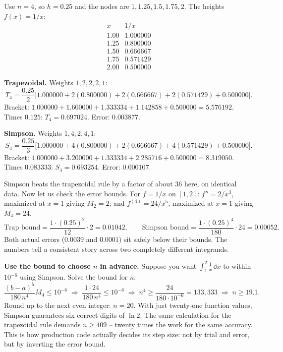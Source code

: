 Use $n = 4$, so $h = 0.25$ and the nodes are $1, 1.25, 1.5, 1.75, 2$. The heights $f(x) = 1/x$:
\[
\begin{array}{c|c}
x & 1/x\\\hline
1.00 & 1.000000\\
1.25 & 0.800000\\
1.50 & 0.666667\\
1.75 & 0.571429\\
2.00 & 0.500000
\end{array}
\]

\textbf{Trapezoidal.} Weights $1,2,2,2,1$:
\[
T_4 = \frac{0.25}{2}\big[1.000000 + 2(0.800000) + 2(0.666667) + 2(0.571429) + 0.500000\big].
\]
Bracket: $1.000000 + 1.600000 + 1.333334 + 1.142858 + 0.500000 = 5.576192$. Times $0.125$: $T_4 = 0.697024$. Error: $0.003877$.

\textbf{Simpson.} Weights $1,4,2,4,1$:
\[
S_4 = \frac{0.25}{3}\big[1.000000 + 4(0.800000) + 2(0.666667) + 4(0.571429) + 0.500000\big].
\]
Bracket: $1.000000 + 3.200000 + 1.333334 + 2.285716 + 0.500000 = 8.319050$. Times $0.083333$: $S_4 = 0.693254$. Error: $0.000107$.

Simpson beats the trapezoidal rule by a factor of about $36$ here, on identical data. Now let us check the error bounds. For $f = 1/x$ on $[1,2]$: $f'' = 2/x^3$, maximized at $x=1$ giving $M_2 = 2$; and $f^{(4)} = 24/x^5$, maximized at $x=1$ giving $M_4 = 24$.
\[
\text{Trap bound} = \frac{1\cdot(0.25)^2}{12}\cdot 2 = 0.01042,\qquad
\text{Simpson bound} = \frac{1\cdot(0.25)^4}{180}\cdot 24 = 0.00052.
\]
Both actual errors ($0.0039$ and $0.0001$) sit safely below their bounds. The numbers tell a consistent story across two completely different integrands.

\begin{labbox}
\textbf{Use the bound to choose $n$ in advance.} Suppose you want $\int_1^2 \tfrac1x\,\dd x$ to within $10^{-6}$ using Simpson. Solve the bound for $n$:
\[
\frac{(b-a)^5}{180\,n^4}M_4 \le 10^{-6}
\;\Longrightarrow\;
\frac{1\cdot 24}{180\,n^4} \le 10^{-6}
\;\Longrightarrow\;
n^4 \ge \frac{24}{180\cdot 10^{-6}} = 133{,}333
\;\Longrightarrow\;
n \ge 19.1.
\]
Round up to the next even integer: $n = 20$. With just twenty-one function values, Simpson guarantees six correct digits of $\ln 2$. The same calculation for the trapezoidal rule demands $n \ge 409$ -- twenty times the work for the same accuracy. This is how production code actually decides its step size: not by trial and error, but by inverting the error bound.
\end{labbox}

